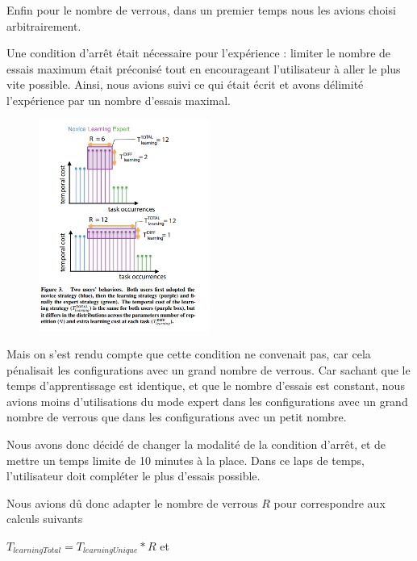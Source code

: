 \documentclass[a4paper, 12pt]{report}
\begin{document}
        Enfin pour le nombre de verrous, dans un premier temps nous les avions choisi arbitrairement.
        
        Une condition d'arrêt était nécessaire pour l'expérience : limiter le nombre de essais 
        maximum était préconisé tout en encourageant l'utilisateur à aller le plus vite possible. 
        Ainsi, nous avions suivi ce qui était écrit et avons délimité l'expérience par un nombre d'essais maximal.
        
        \begin{figure}[H]
            \centering
            \includegraphics[width=0.5\textwidth]{img/fig1bad.png}
        \end{figure}
        
        Mais on s'est rendu compte que cette condition ne convenait pas, car cela pénalisait les 
        configurations avec un grand nombre de verrous. Car sachant que le temps d'apprentissage est 
        identique, et que le nombre d'essais est constant, nous avions moins d'utilisations du mode 
        expert dans les configurations avec un grand nombre de verrous que dans les configurations avec un 
        petit nombre.
        
        Nous avons donc décidé de changer la modalité de la condition d'arrêt, et de mettre un temps 
        limite de 10 minutes à la place. Dans ce laps de temps, l'utilisateur doit compléter le plus d'essais possible. 
        
        Nous avions dû donc adapter le nombre de verrous $R$ pour correspondre aux calculs suivants 
        
        $T_{learningTotal} = T_{learningUnique} * R$ et 
        
\end{document}
